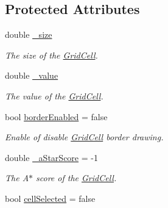 \subsection*{Protected Attributes}
\begin{DoxyCompactItemize}
\item 
double \hyperlink{classGridCell_a6da426a6abc1a134c69f1b81647d9cfa}{\+\_\+size}\hypertarget{classGridCell_a6da426a6abc1a134c69f1b81647d9cfa}{}\label{classGridCell_a6da426a6abc1a134c69f1b81647d9cfa}

\begin{DoxyCompactList}\small\item\em The size of the \hyperlink{classGridCell}{Grid\+Cell}. \end{DoxyCompactList}\item 
double \hyperlink{classGridCell_a933654fb91fed011c81b0a70af3e1f5a}{\+\_\+value}\hypertarget{classGridCell_a933654fb91fed011c81b0a70af3e1f5a}{}\label{classGridCell_a933654fb91fed011c81b0a70af3e1f5a}

\begin{DoxyCompactList}\small\item\em The value of the \hyperlink{classGridCell}{Grid\+Cell}. \end{DoxyCompactList}\item 
bool \hyperlink{classGridCell_aa153cae8dd39f3435f0d94af62fc506c}{border\+Enabled} = false\hypertarget{classGridCell_aa153cae8dd39f3435f0d94af62fc506c}{}\label{classGridCell_aa153cae8dd39f3435f0d94af62fc506c}

\begin{DoxyCompactList}\small\item\em Enable of disable \hyperlink{classGridCell}{Grid\+Cell} border drawing. \end{DoxyCompactList}\item 
double \hyperlink{classGridCell_a2c12f31b0b0f64b0c90624ab596cd0e6}{\+\_\+a\+Star\+Score} = -\/1\hypertarget{classGridCell_a2c12f31b0b0f64b0c90624ab596cd0e6}{}\label{classGridCell_a2c12f31b0b0f64b0c90624ab596cd0e6}

\begin{DoxyCompactList}\small\item\em The A$\ast$ score of the \hyperlink{classGridCell}{Grid\+Cell}. \end{DoxyCompactList}\item 
bool \hyperlink{classGridCell_ace80d646d21ff2134df71a64a4b4222d}{cell\+Selected} = false\hypertarget{classGridCell_ace80d646d21ff2134df71a64a4b4222d}{}\label{classGridCell_ace80d646d21ff2134df71a64a4b4222d}


\end{DoxyCompactItemize}
